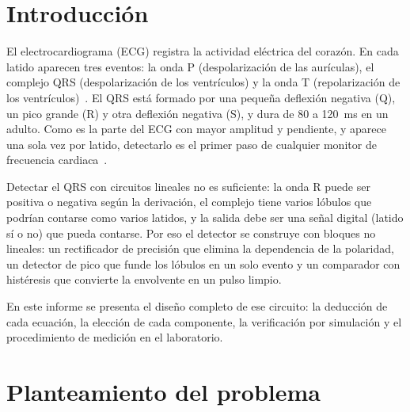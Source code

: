 \documentclass[11pt,letterpaper]{article}
\begin{document}
\newpage
\tableofcontents
\newpage
\listoffigures
\listoftables
\newpage

\section{Introducción}

El electrocardiograma (ECG) registra la actividad eléctrica del corazón. En cada latido aparecen tres eventos: la onda P (despolarización de las aurículas), el complejo QRS (despolarización de los ventrículos) y la onda T (repolarización de los ventrículos)~\cite{guyton}. El QRS está formado por una pequeña deflexión negativa (Q), un pico grande (R) y otra deflexión negativa (S), y dura de 80 a \SI{120}{ms} en un adulto. Como es la parte del ECG con mayor amplitud y pendiente, y aparece una sola vez por latido, detectarlo es el primer paso de cualquier monitor de frecuencia cardiaca~\cite{pantompkins}.

Detectar el QRS con circuitos lineales no es suficiente: la onda R puede ser positiva o negativa según la derivación, el complejo tiene varios lóbulos que podrían contarse como varios latidos, y la salida debe ser una señal digital (latido sí o no) que pueda contarse. Por eso el detector se construye con bloques no lineales: un rectificador de precisión que elimina la dependencia de la polaridad, un detector de pico que funde los lóbulos en un solo evento y un comparador con histéresis que convierte la envolvente en un pulso limpio.

En este informe se presenta el diseño completo de ese circuito: la deducción de cada ecuación, la elección de cada componente, la verificación por simulación y el procedimiento de medición en el laboratorio.

\section{Planteamiento del problema}

\begin{center}
\end{center}
\end{document}
